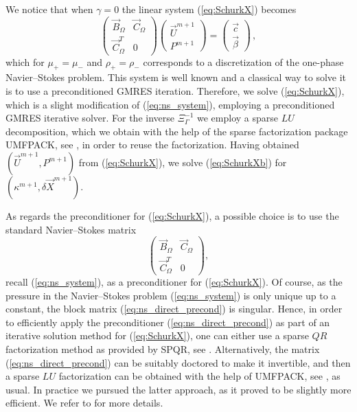 \documentclass[a4paper,12pt,onecolumn]{article}
\begin{document}
We notice that when $\gamma = 0$ the linear system (\ref{eq:SchurkX}) becomes
\begin{equation} \label{eq:ns_system}
\begin{pmatrix}
\vec B_\Omega & \vec C_\Omega \\
\vec C_\Omega^T & 0
\end{pmatrix}
\begin{pmatrix}
\vec U^{m+1} \\ P^{m+1}
\end{pmatrix}
= \begin{pmatrix}
\vec c \\
\vec \beta
\end{pmatrix}\,,
\end{equation}
which for $\mu_+=\mu_-$ and $\rho_+ = \rho_-$
corresponds to a discretization of the one-phase
Navier--Stokes problem. This system is well known and a classical way to solve
it is to use a preconditioned GMRES iteration. Therefore, we solve
(\ref{eq:SchurkX}), which is a slight modification of (\ref{eq:ns_system}),
employing a preconditioned GMRES iterative solver. For the inverse
$\Xi_\Gamma^{-1}$ we employ a sparse $LU$ decomposition, which we obtain with
the help of the sparse factorization package UMFPACK, see \cite{Davis04}, in
order to reuse the factorization. Having obtained $(\vec U^{m+1}, P^{m+1})$ from
(\ref{eq:SchurkX}), we solve (\ref{eq:SchurkXb}) for $(\kappa^{m+1}, \delta\vec
X^{m+1})$.

As regards the preconditioner for (\ref{eq:SchurkX}),
a possible choice is to use the standard Navier--Stokes matrix
\begin{equation}\label{eq:ns_direct_precond}
\begin{pmatrix} \vec B_\Omega & \vec C_\Omega \\
\vec C_\Omega^T & 0 \end{pmatrix},
\end{equation}
recall (\ref{eq:ns_system}),
as a preconditioner for (\ref{eq:SchurkX}).
Of course, as the pressure in the Navier--Stokes problem
(\ref{eq:ns_system}) is only unique up to a constant, the block matrix
(\ref{eq:ns_direct_precond}) is singular. Hence, in order to efficiently apply
the preconditioner (\ref{eq:ns_direct_precond}) as part of an iterative
solution method for (\ref{eq:SchurkX}), one can either use a sparse $QR$
factorization method as provided by SPQR, see \cite{Davis11}. Alternatively,
the matrix (\ref{eq:ns_direct_precond}) can be suitably doctored to make it
invertible, and then a sparse $LU$ factorization can be obtained with the help
of UMFPACK, see \cite{Davis04}, as usual. In practice we pursued the latter
approach, as it proved to be slightly more efficient. We refer to
\cite[\S4.6]{Agnese} for more details.
\end{document}
